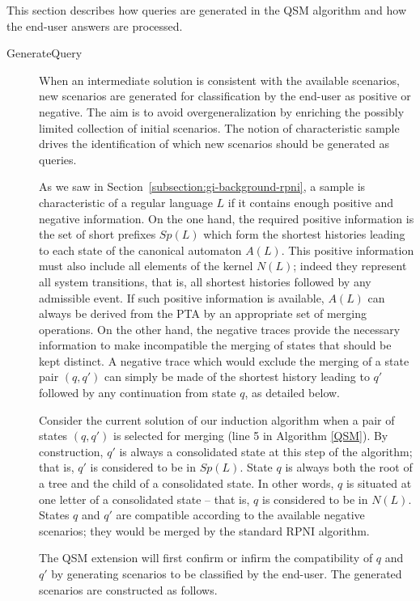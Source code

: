 This section describes how queries are generated in the \textsc{QSM} algorithm and how the end-user answers are processed.

\begin{description}

\item[GenerateQuery] When an intermediate solution is consistent with the available scenarios, new scenarios are generated for classification by the end-user as positive or negative. The aim is to avoid overgeneralization by enriching the possibly limited collection of initial scenarios. The notion of characteristic sample drives the identification of which new scenarios should be generated as queries. 

As we saw in Section~\ref{subsection:gi-background-rpni}, a sample is characteristic of a regular language $L$ if it contains enough positive and negative information. On the one hand, the required positive information is the set of short prefixes $Sp(L)$ which form the shortest histories leading to each state of the canonical automaton $A(L)$. This positive information must also include all elements of the kernel $N(L)$; indeed they represent all system transitions, that is, all shortest histories followed by any admissible event. If such positive information is available, $A(L)$ can always be derived from the PTA by an appropriate set of merging operations. On the other hand, the negative traces provide the necessary information to make incompatible the merging of states that should be kept distinct. A negative trace which would exclude the merging of a state pair $(q, q')$ can simply be made of the shortest history leading to $q'$ followed by any continuation from state $q$, as detailed below.

Consider the current solution of our induction algorithm when a pair of states $(q, q')$ is selected for merging (line 5 in Algorithm \ref{QSM}). By construction, $q'$ is always a consolidated state at this step of the algorithm; that is, $q'$ is considered to be in $Sp(L)$. State $q$ is always both the root of a tree and the child of a consolidated state. In other words, $q$ is situated at one letter of a consolidated state -- that is, $q$ is considered to be in $N(L)$. States $q$ and $q'$ are compatible according to the available negative scenarios; they would be merged by the standard RPNI algorithm. 

The QSM extension will first confirm or infirm the compatibility of $q$ and $q'$ by generating scenarios to be classified by the end-user. The generated scenarios are constructed as follows.


\end{description}
